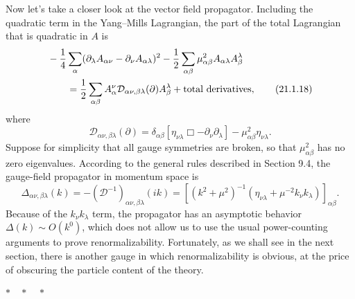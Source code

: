 Now let's take a closer look at the vector field propagator. Including the
quadratic term in the Yang--Mills Lagrangian, the part of the total
Lagrangian that is quadratic in $A$ is
\begin{align}
 &-\frac14\sum_\alpha
 (\partial_\lambda A_{\alpha\nu}-\partial_\nu A_{\alpha\lambda})^2
 -\frac12\sum_{\alpha\beta}\mu^2_{\alpha\beta}
 A_{\alpha\lambda}A_\beta^\lambda
 \notag\\
 &\qquad={}
 \frac12\sum_{\alpha\beta}
 A_\alpha^\nu\mathcal D_{\alpha\nu,\beta\lambda}(\partial)
 A_\beta^\lambda+\text{total derivatives},
 \tag{21.1.18}\label{eq:21.1.18}
\end{align}
where
\begin{equation}
 \mathcal D_{\alpha\nu,\beta\lambda}(\partial)
 =\delta_{\alpha\beta}
 [\eta_{\nu\lambda}\Box-\partial_\nu\partial_\lambda]
 -\mu^2_{\alpha\beta}\eta_{\nu\lambda}.
 \tag{21.1.19}\label{eq:21.1.19}
\end{equation}
Suppose for simplicity that all gauge symmetries are broken, so that
$\mu^2_{\alpha\beta}$ has no zero eigenvalues. According to the general
rules described in Section 9.4, the gauge-field propagator in momentum
space is
\begin{equation}
 \Delta_{\alpha\nu,\beta\lambda}(k)
 =-(\mathcal D^{-1})_{\alpha\nu,\beta\lambda}(ik)
 =\left[(k^2+\mu^2)^{-1}
 \left(\eta_{\nu\lambda}+\mu^{-2}k_\nu k_\lambda\right)
 \right]_{\alpha\beta}.
 \tag{21.1.20}\label{eq:21.1.20}
\end{equation}
Because of the $k_\nu k_\lambda$ term, the propagator has an asymptotic
behavior $\Delta(k)\sim O(k^0)$, which does not allow us to use the usual
power-counting arguments to prove renormalizability. Fortunately, as we
shall see in the next section, there is another gauge in which
renormalizability is obvious, at the price of obscuring the particle content
of the theory.

\begin{center}
$\ast\quad\ast\quad\ast$
\end{center}

